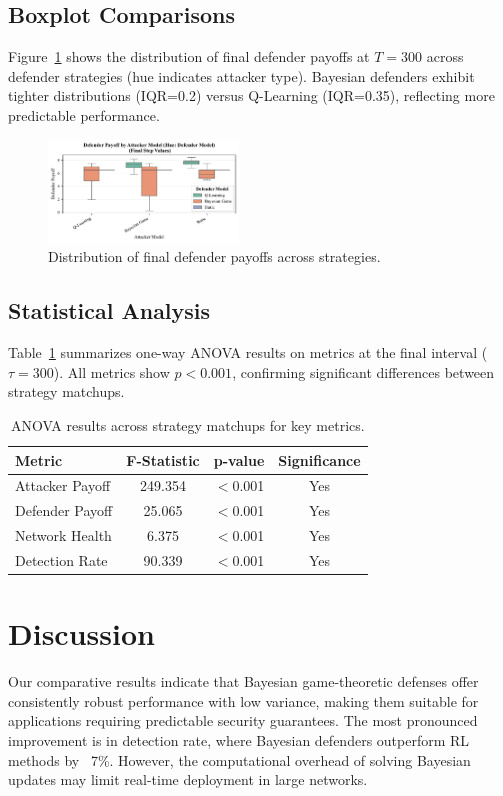 \documentclass[conference]{IEEEtran}
\begin{document}
\subsection{Boxplot Comparisons}
Figure~\ref{fig:def_box} shows the distribution of final defender payoffs at $T=300$ across defender strategies (hue indicates attacker type). Bayesian defenders exhibit tighter distributions (IQR=0.2) versus Q-Learning (IQR=0.35), reflecting more predictable performance.

\begin{figure}[htbp]
  \centering
  \includegraphics[width=0.45\textwidth]{fig_def_payoff_boxplot.pdf}
  \caption{Distribution of final defender payoffs across strategies.}
  \label{fig:def_box}   
\end{figure}

\subsection{Statistical Analysis}
Table~\ref{tab:anova} summarizes one-way ANOVA results on metrics at the final interval ($\tau=300$). All metrics show $p<0.001$, confirming significant differences between strategy matchups.

\begin{table}[htbp]
  \centering
  \caption{ANOVA results across strategy matchups for key metrics.}
  \label{tab:anova}
  \begin{tabular}{lccc}
    \toprule
    \textbf{Metric} & \textbf{F-Statistic} & \textbf{p-value} & \textbf{Significance} \\
    \midrule
    Attacker Payoff & 249.354 & $<$0.001 & Yes \\
    Defender Payoff & 25.065 & $<$0.001 & Yes \\
    Network Health   & 6.375  & $<$0.001 & Yes \\
    Detection Rate   & 90.339 & $<$0.001 & Yes \\
    \bottomrule
  \end{tabular}
\end{table}

\section{Discussion}
Our comparative results indicate that Bayesian game-theoretic defenses offer consistently robust performance with low variance, making them suitable for applications requiring predictable security guarantees. The most pronounced improvement is in detection rate, where Bayesian defenders outperform RL methods by ~7\%. However, the computational overhead of solving Bayesian updates may limit real-time deployment in large networks.
\end{document}
